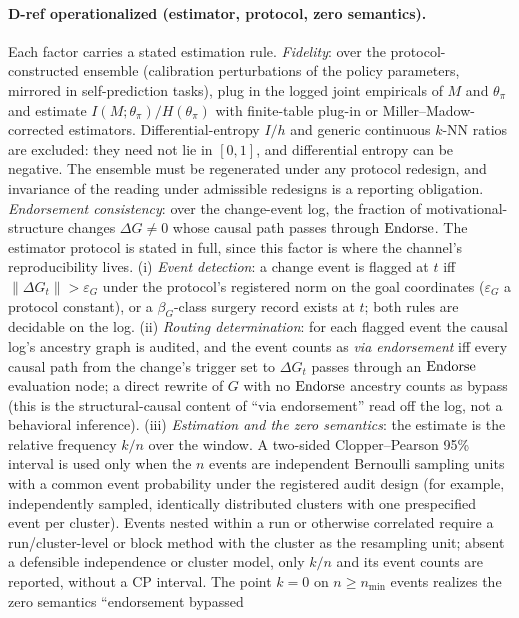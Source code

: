 \paragraph{D-ref operationalized (estimator, protocol, zero semantics).}
Each factor carries a stated estimation rule. \emph{Fidelity}: over the
protocol-constructed ensemble (calibration perturbations of the policy
parameters, mirrored in self-prediction tasks), plug in the logged joint
empiricals of $M$ and $\theta_\pi$ and estimate
$I(M;\theta_\pi)/H(\theta_\pi)$ with finite-table plug-in or
Miller--Madow-corrected estimators. Differential-entropy $I/h$ and generic
continuous $k$-NN ratios are excluded: they need not lie in $[0,1]$, and
differential entropy can be negative. The ensemble must be regenerated under
any protocol redesign, and invariance of the reading under admissible
redesigns is a reporting obligation. \emph{Endorsement consistency}: over the
change-event log, the fraction of motivational-structure changes
$\Delta G\neq0$ whose causal path passes through $\mathrm{Endorse}$. The estimator
protocol is stated in full, since this factor is where the channel's
reproducibility lives. (i) \emph{Event detection}: a change event is flagged
at $t$ iff $\|\Delta G_t\|>\varepsilon_G$ under the protocol's registered
norm on the goal coordinates ($\varepsilon_G$ a protocol constant), or a
$\beta_G$-class surgery record exists at $t$; both rules are decidable on the
log. (ii) \emph{Routing determination}: for each flagged event the causal
log's ancestry graph is audited, and the event counts as \emph{via
endorsement} iff every causal path from the change's trigger set to
$\Delta G_t$ passes through an $\mathrm{Endorse}$ evaluation node; a direct rewrite
of $G$ with no $\mathrm{Endorse}$ ancestry counts as bypass (this is the
structural-causal content of ``via endorsement'' read off the log, not a
behavioral inference). (iii) \emph{Estimation and the zero semantics}: the
estimate is the relative frequency $k/n$ over the window. A two-sided
Clopper--Pearson 95\% interval is used only when the $n$ events are
independent Bernoulli sampling units with a common event probability under
the registered audit design (for example, independently sampled, identically
distributed clusters with one prespecified event per cluster). Events nested within a run or otherwise correlated require a
run/cluster-level or block method with the cluster as the resampling unit;
absent a defensible independence or cluster model, only $k/n$ and its event
counts are reported, without a CP interval. The point $k=0$ on
$n\ge n_{\min}$ events realizes the zero semantics ``endorsement bypassed
